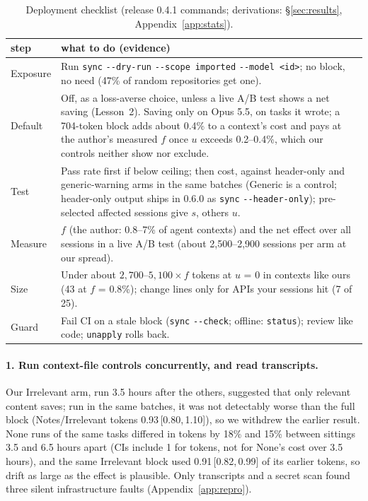 \documentclass[11pt]{article}
\newcommand{\ci}[2]{\,[#1,\,#2]}
\newcommand{\code}[1]{\texttt{#1}}
\newcommand{\flag}[1]{\texttt{-{}-#1}}%
\newcommand{\aNone}{\textsf{None}\xspace}
\newcommand{\aNotes}{\textsf{Notes}\xspace}
\newcommand{\aIrr}{\textsf{Irrelevant}\xspace}
\newcommand{\aGen}{\textsf{Generic}\xspace}
\begin{document}
\begin{table}[t]
\centering
\footnotesize
\setlength{\tabcolsep}{2pt}
\begin{tabular}{@{}l>{\raggedright\arraybackslash}p{}@{}}
\toprule
step & what to do (evidence) \\
\midrule
Exposure & Run \code{sync} \flag{dry-run} \flag{scope}~\code{imported} \flag{model}~\code{<id>}; no block, no need (47\% of random repositories get one). \\
Default & Off, as a loss-averse choice, unless a live A/B test shows a net saving (Lesson~2). Saving only on Opus 5.5, on tasks it wrote; a 704-token block adds about 0.4\% to a context's cost and pays at the author's measured $f$ once $u$ exceeds 0.2--0.4\%, which our controls neither show nor exclude. \\
Test & Pass rate first if below ceiling; then cost, against header-only and generic-warning arms in the same batches (\aGen is a control; header-only output ships in 0.6.0 as \code{sync} \flag{header-only}); pre-selected affected sessions give $s$, others $u$. \\
Measure & $f$ (the author: 0.8--7\% of agent contexts) and the net effect over all sessions in a live A/B test (about 2,500--2,900 sessions per arm at our spread). \\
Size & Under about $2{,}700$--$5{,}100 \times f$ tokens at $u$ = 0 in contexts like ours (43 at $f$ = 0.8\%); change lines only for APIs your sessions hit (7 of 25). \\
Guard & Fail CI on a stale block (\code{sync} \flag{check}; offline: \code{status}); review like code; \code{unapply} rolls back. \\
\bottomrule
\end{tabular}
\caption{Deployment checklist (release 0.4.1 commands; derivations: \S\ref{sec:results}, Appendix~\ref{app:stats}).}
\label{tab:checklist}
\end{table}

\paragraph{1. Run context-file controls concurrently, and read transcripts.}
Our \aIrr arm, run 3.5 hours after the others, suggested that only relevant content saves; run in the same batches, it was not detectably worse than the full block (\aNotes/\aIrr tokens 0.93\ci{0.80}{1.10}), so we withdrew the earlier result.
\aNone runs of the same tasks differed in tokens by 18\% and 15\% between sittings 3.5 and 6.5 hours apart (CIs include 1 for tokens, not for \aNone's cost over 3.5 hours), and the same \aIrr block used 0.91\ci{0.82}{0.99} of its earlier tokens, so drift as large as the effect is plausible.
Only transcripts and a secret scan found three silent infrastructure faults (Appendix~\ref{app:repro}).
\end{document}
